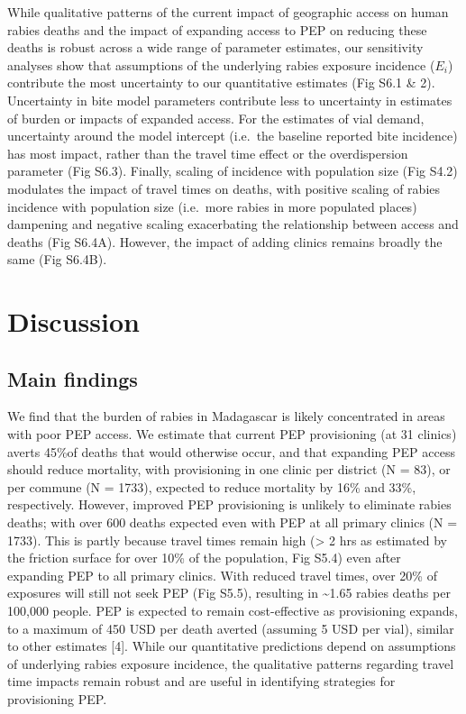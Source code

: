 \documentclass[
  oneside]{book}
\begin{document}
While qualitative patterns of the current impact of geographic access on
human rabies deaths and the impact of expanding access to PEP on
reducing these deaths is robust across a wide range of parameter
estimates, our sensitivity analyses show that assumptions of the
underlying rabies exposure incidence (\(E_{i}\)) contribute the most
uncertainty to our quantitative estimates (Fig S6.1 \& 2). Uncertainty in
bite model parameters contribute less to uncertainty in estimates of
burden or impacts of expanded access. For the estimates of vial demand,
uncertainty around the model intercept (i.e.~the baseline reported bite
incidence) has most impact, rather than the travel time effect or the
overdispersion parameter (Fig S6.3). Finally, scaling of incidence with
population size (Fig S4.2) modulates the impact of travel times on
deaths, with positive scaling of rabies incidence with population size
(i.e.~more rabies in more populated places) dampening and negative
scaling exacerbating the relationship between access and deaths (Fig
S6.4A). However, the impact of adding clinics remains broadly the same
(Fig S6.4B).

\hypertarget{discussion-1}{%
\section{Discussion}\label{discussion-1}}

\hypertarget{main-findings}{%
\subsection{Main findings}\label{main-findings}}

We find that the burden of rabies in Madagascar is likely concentrated
in areas with poor PEP access. We estimate that current PEP provisioning
(at 31 clinics) averts 45\%of deaths that would otherwise occur, and that
expanding PEP access should reduce mortality, with provisioning in one
clinic per district (N = 83), or per commune (N = 1733), expected to
reduce mortality by 16\% and 33\%, respectively. However, improved PEP
provisioning is unlikely to eliminate rabies deaths; with over 600
deaths expected even with PEP at all primary clinics (N = 1733). This is
partly because travel times remain high (\textgreater{} 2 hrs as estimated by the
friction surface for over 10\% of the population, Fig S5.4) even after
expanding PEP to all primary clinics. With reduced travel times, over
20\% of exposures will still not seek PEP (Fig S5.5), resulting in \textasciitilde1.65
rabies deaths per 100,000 people. PEP is expected to remain
cost-effective as provisioning expands, to a maximum of 450 USD per
death averted (assuming 5 USD per vial), similar to other estimates
{[}4{]}. While our quantitative predictions depend on assumptions of
underlying rabies exposure incidence, the qualitative patterns regarding
travel time impacts remain robust and are useful in identifying
strategies for provisioning PEP.
\end{document}
